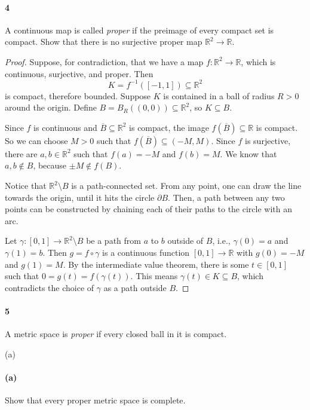 \documentclass[12pt]{article}
\newlength{\myparskip}
\newenvironment{fullbox}{\begin{lrbox}{\savefullbox}\begin{minipage}{\dimexpr\textwidth-2\fboxsep\relax}\setlength{\parskip}{\myparskip}}{\end{minipage}\end{lrbox}\framebox[\textwidth]{\usebox{\savefullbox}}}
\newenvironment{pbox}[1][]{\begin{fullbox}\ifx#1\empty\else\paragraph{#1}\fi}{\end{fullbox}}
\theoremstyle{definition}
\newcommand{\R}{\mathbb{R}}
\newcommand{\<}{\langle}
\renewcommand{\>}{\rangle}
\newcommand{\clo}{\overline}
\newcommand{\bd}{\partial}
\begin{document}
\newpage
\begin{pbox}[4]
    A continuous map is called \textit{proper} if the preimage of every compact set is compact. Show that there is no surjective proper map $\R^2 \to \R$.
\end{pbox}

\begin{proof}
    Suppose, for contradiction, that we have a map $f : \R^2 \to \R$, which is continuous, surjective, and proper. Then
    \[
        K = f^{-1}([-1, 1]) \subseteq \R^2
    \]
    is compact, therefore bounded. Suppose $K$ is contained in a ball of radius $R > 0$ around the origin. Define $B = B_R((0, 0)) \subseteq \R^2$, so $K \subseteq B$.

    Since $f$ is continuous and $\clo{B} \subseteq \R^2$ is compact, the image $f(\clo{B}) \subseteq \R$ is compact. So we can choose $M > 0$ such that $f(\clo{B}) \subseteq (-M, M)$. Since $f$ is surjective, there are $a, b \in \R^2$ such that $f(a) = -M$ and $f(b) = M$. We know that $a, b \notin B$, because $\pm M \notin f(B)$.

    Notice that $\R^2 \setminus B$ is a path-connected set. From any point, one can draw the line towards the origin, until it hits the circle $\bd B$. Then, a path between any two points can be constructed by chaining each of their paths to the circle with an arc.

    Let $\gamma : [0, 1] \to \R^2 \setminus B$ be a path from $a$ to $b$ outside of $B$, i.e., $\gamma(0) = a$ and $\gamma(1) = b$. Then $g = f \circ \gamma$ is a continuous function $[0, 1] \to \R$ with $g(0) = -M$ and $g(1) = M$. By the intermediate value theorem, there is some $t \in [0, 1]$ such that $0 = g(t) = f(\gamma(t))$. This means $\gamma(t) \in K \subseteq B$, which contradicts the choice of $\gamma$ as a path outside $B$.

\end{proof}


\newpage
\begin{pbox}[5]
    A metric space is \textit{proper} if every closed ball in it is compact.
\end{pbox}

\begin{pbox}[(a)]
    Show that every proper metric space is complete.
\end{pbox}
\end{document}
